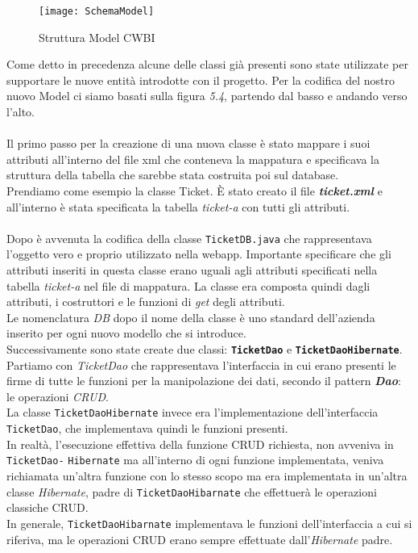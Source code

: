 \begin{figure}[H]
    \centering 
    \texttt{[image: SchemaModel]} 
    \bigskip
    \caption{Struttura Model CWBI}
\end{figure}

\noindent
Come detto in precedenza alcune delle classi già presenti sono state utilizzate per supportare le nuove entità introdotte con il progetto. Per la codifica del nostro nuovo Model ci siamo basati sulla figura \textit{5.4}, partendo dal basso e andando verso l'alto.  \\
\\
\noindent
Il primo passo per la creazione di una nuova classe è stato mappare i suoi attributi all'interno del file xml che conteneva la mappatura e specificava la struttura della tabella che sarebbe stata costruita poi sul database. \\
Prendiamo come esempio la classe Ticket. È stato creato il file \textit{\textbf{ticket.xml}} e all'interno è stata specificata la tabella \textit{ticket-a} con tutti gli attributi.\\
\\
\noindent
Dopo è avvenuta la codifica della classe \texttt{TicketDB.java} che rappresentava l'oggetto vero e proprio utilizzato nella  webapp. Importante specificare che gli attributi inseriti in questa classe erano uguali agli attributi specificati nella tabella   \textit{ticket-a} nel file di mappatura. La classe era composta quindi dagli attributi, i costruttori e le funzioni di \textit{get} degli attributi.\\
Le nomenclatura \textit{DB} dopo il nome della classe è uno standard dell'azienda inserito per ogni nuovo modello che si introduce.
\\
\noindent
Successivamente sono state create due classi: \texttt{\textbf{TicketDao}} e \texttt{\textbf{TicketDaoHibernate}}. \\
Partiamo con \textit{TicketDao} che rappresentava l'interfaccia in cui erano presenti le firme di tutte le funzioni per la manipolazione dei dati, secondo il pattern \textit{\textbf{Dao\glsfirstoccur}}: le operazioni \textit{CRUD\glsfirstoccur}. \\
La classe \texttt{TicketDaoHibernate} invece era l'implementazione dell'interfaccia \texttt{TicketDao}, che implementava quindi le funzioni presenti. \\
In realtà, l'esecuzione effettiva della funzione CRUD richiesta, non avveniva in \texttt{TicketDao-} \texttt{Hibernate} ma all'interno di ogni funzione implementata, veniva richiamata un'altra funzione con lo stesso scopo ma era implementata in un'altra classe \textit{Hibernate}, padre di \texttt{TicketDaoHibarnate} che 
effettuerà le operazioni classiche CRUD. \\
In generale, \texttt{TicketDaoHibarnate} implementava le funzioni dell'interfaccia a cui si riferiva, ma le operazioni CRUD erano sempre effettuate dall'\textit{Hibernate} padre.\\

